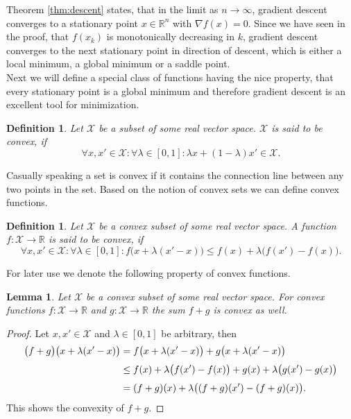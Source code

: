 \documentclass[11pt, a4paper]{article}
\newtheorem{lemma}[theorem]{Lemma}
\newtheorem{definition}[theorem]{Definition}
\newcommand{\R}{\mathbb{R}}
\newcommand{\X}{\mathcal{X}}
\begin{document}
Theorem \ref{thm:descent} states, that in the limit as $n \to \infty$, gradient descent converges to a stationary point $x \in \R^n$ with $\nabla f(x) = 0$. Since we have seen in the proof, that $f(x_k)$ is monotonically decreasing in $k$, gradient descent converges to the next stationary point in direction of descent, which is either a local minimum, a global minimum or a saddle point. \\

Next we will define a special class of functions having the nice property, that every stationary point is a global minimum and therefore gradient descent is an excellent tool for minimization.

\begin{definition}
Let $\X$ be a subset of some real vector space. $\X$ is said to be convex, if 
\[ \forall x, x' \in \X : \forall \lambda \in [0,1] : \lambda x + (1 - \lambda) x' \in \X. \]
\end{definition}

Casually speaking a set is convex if it contains the connection line between any two points in the set. Based on the notion of convex sets we can define convex functions.

\begin{definition}
Let $\X$ be a convex subset of some real vector space. A function $f: \X \to \R$ is said to be convex, if
\[ \forall x,x' \in \X : \forall \lambda \in [0,1] : f \big (x + \lambda (x'-x) \big ) \leq f(x) + \lambda \big ( f(x') - f(x) \big ). \]
\end{definition}

For later use we denote the following property of convex functions.

\begin{lemma} \label{lem:convexity}
Let $\X$ be a convex subset of some real vector space. For convex functions $f: \X \to \R$ and $g: \X \to \R$ the sum $f+g$ is convex as well.
\end{lemma}

\begin{proof}
Let $x,x' \in \X$ and $\lambda \in [0,1]$ be arbitrary, then
\[ \begin{split}
\big ( f+g \big ) \big (x + \lambda (x'-x) \big ) 
&= f \big ( x + \lambda (x'-x) \big ) + g \big (x + \lambda (x'-x) \big ) \\\
\textcolor{white}{\Big |} &\leq f(x) + \lambda \big ( f(x') - f(x) \big ) + g(x) + \lambda \big ( g(x') - g(x) \big ) \\\
&= ( f + g )(x) + \lambda \big ( (f + g)(x') - (f+g)(x) \big ).
\end{split} \]
This shows the convexity of $f+g$.
\end{proof}
\end{document}
